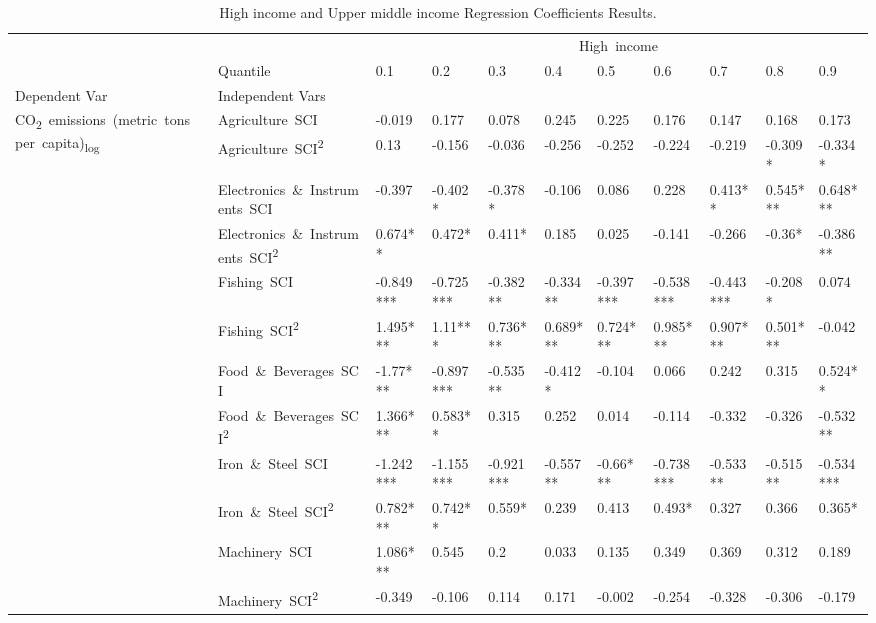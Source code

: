 \documentclass[10pt]{article}
\begin{document}
\begin{table}[ht]
	\centering
	\caption{High income and Upper middle income Regression Coefficients Results.}
\begin{adjustbox}{width=\textwidth,center}
      \begin{tabular}{lllllllllll}
      \toprule
       &  & \multicolumn{9}{c}{High\ income} \\
       & Quantile & 0.1 & 0.2 & 0.3 & 0.4 & 0.5 & 0.6 & 0.7 & 0.8 & 0.9 \\
      Dependent Var & Independent Vars &  &  &  &  &  &  &  &  &  \\
      \midrule
      \multirow[t]{31}{*}{CO\textsubscript{2}\ emissions\ (metric\ tons\ per\ capita)\textsubscript{log}} & Agriculture\ SCI & -0.019 & 0.177 & 0.078 & 0.245 & 0.225 & 0.176 & 0.147 & 0.168 & 0.173 \\
      & Agriculture\ SCI\textsuperscript{2} & 0.13 & -0.156 & -0.036 & -0.256 & -0.252 & -0.224 & -0.219 & -0.309* & -0.334* \\
      & Electronics\ \&\ Instruments\ SCI & -0.397 & -0.402* & -0.378* & -0.106 & 0.086 & 0.228 & 0.413** & 0.545*** & 0.648*** \\
      & Electronics\ \&\ Instruments\ SCI\textsuperscript{2} & 0.674** & 0.472* & 0.411* & 0.185 & 0.025 & -0.141 & -0.266 & -0.36* & -0.386** \\
      & Fishing\ SCI & -0.849*** & -0.725*** & -0.382** & -0.334** & -0.397*** & -0.538*** & -0.443*** & -0.208* & 0.074 \\
      & Fishing\ SCI\textsuperscript{2} & 1.495*** & 1.11*** & 0.736*** & 0.689*** & 0.724*** & 0.985*** & 0.907*** & 0.501*** & -0.042 \\
      & Food\ \&\ Beverages\ SCI & -1.77*** & -0.897*** & -0.535** & -0.412* & -0.104 & 0.066 & 0.242 & 0.315 & 0.524** \\
      & Food\ \&\ Beverages\ SCI\textsuperscript{2} & 1.366*** & 0.583** & 0.315 & 0.252 & 0.014 & -0.114 & -0.332 & -0.326 & -0.532** \\
      & Iron\ \&\ Steel\ SCI & -1.242*** & -1.155*** & -0.921*** & -0.557** & -0.66*** & -0.738*** & -0.533** & -0.515** & -0.534*** \\
      & Iron\ \&\ Steel\ SCI\textsuperscript{2} & 0.782*** & 0.742** & 0.559* & 0.239 & 0.413 & 0.493* & 0.327 & 0.366 & 0.365* \\
      & Machinery\ SCI & 1.086*** & 0.545 & 0.2 & 0.033 & 0.135 & 0.349 & 0.369 & 0.312 & 0.189 \\
      & Machinery\ SCI\textsuperscript{2} & -0.349 & -0.106 & 0.114 & 0.171 & -0.002 & -0.254 & -0.328 & -0.306 & -0.179 \\

\end{tabular}
\end{adjustbox}
\end{table}
\end{document}
